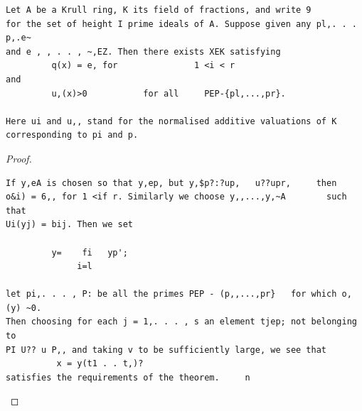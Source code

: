 \begin{theorem}\label{mcrt-auto-theorem-12-6}\uses{}
\begin{verbatim}
Let A be a Krull ring, K its field of fractions, and write 9
for the set of height I prime ideals of A. Suppose given any pl,. . . p,.e~
and e , , . . , ~,EZ. Then there exists XEK satisfying
         q(x) = e, for               1 <i < r
and
         u,(x)>0           for all     PEP-{pl,...,pr}.

Here ui and u,, stand for the normalised additive valuations of K
corresponding to pi and p.
\end{verbatim}
\end{theorem}
\begin{proof}
\begin{verbatim}
If y,eA is chosen so that y,ep, but y,$p?:?up,   u??upr,     then
o&i) = 6,, for 1 <if r. Similarly we choose y,,...,y,~A        such that
Ui(yj) = bij. Then we set

         y=    fi   yp';
              i=l

let pi,. . . , P: be all the primes PEP - (p,,...,pr}   for which o,(y) ~0.
Then choosing for each j = 1,. . . , s an element tjep; not belonging to
PI U?? u P,, and taking v to be sufficiently large, we see that
          x = y(t1 . . t,)?
satisfies the requirements of the theorem.     n
\end{verbatim}
\end{proof}
